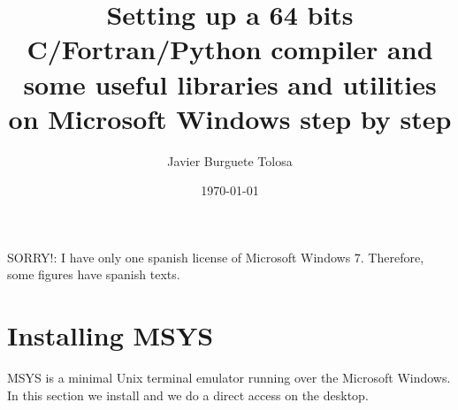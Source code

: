 \documentclass[a4paper]{article}
\title{Setting up a 64 bits C/Fortran/Python compiler and some useful libraries
and utilities on Microsoft Windows step by step}
\author{Javier Burguete Tolosa}
\date{\today}
\begin{document}
\maketitle

\tableofcontents

\section*{}

SORRY!: I have only one spanish license of Microsoft Windows 7. Therefore, some
figures have spanish texts.

\section{Installing MSYS}

MSYS is a minimal Unix terminal emulator running over the Microsoft Windows. In
this section we install and we do a direct access on the desktop.
\end{document}
